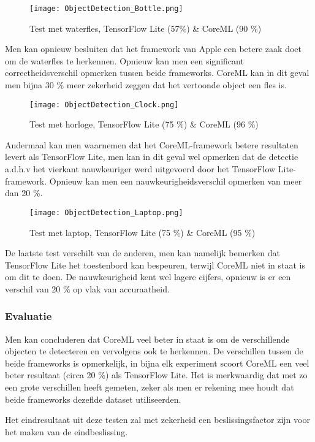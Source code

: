 \begin{figure}[H]
	\centering
	\texttt{[image: ObjectDetection\_Bottle.png]}
	\caption{Test met waterfles, TensorFlow Lite (57\%) \& CoreML (90 \%)}
\end{figure}
Men kan opnieuw besluiten dat het framework van Apple een betere zaak doet om de waterfles te herkennen. Opnieuw kan men een significant correctheidsverschil opmerken tussen beide frameworks. CoreML kan in dit geval men bijna 30 \% meer zekerheid zeggen dat het vertoonde object een fles is.
\begin{figure}[H]
	\centering
	\texttt{[image: ObjectDetection\_Clock.png]}
	\caption{Test met horloge, TensorFlow Lite (75 \%) \& CoreML (96 \%)}
\end{figure}
Andermaal kan men waarnemen dat het CoreML-framework betere resultaten levert als TensorFlow Lite, men kan in dit geval wel opmerken dat de detectie a.d.h.v het vierkant nauwkeuriger werd uitgevoerd door het TensorFlow Lite-framework. Opnieuw kan men een nauwkeurigheidsverschil opmerken van meer dan 20 \%.

\begin{figure}[H]
	\centering
	\texttt{[image: ObjectDetection\_Laptop.png]}
	\caption{Test met laptop, TensorFlow Lite (75 \%) \& CoreML (95 \%)}
\end{figure}
De laatste test verschilt van de anderen, men kan namelijk bemerken dat TensorFlow Lite het toestenbord kan bespeuren, terwijl CoreML niet in staat is om dit te doen. De nauwkeurigheid kent wel lagere cijfers, opnieuw is er een verschil van 20 \% op vlak van accuraatheid.
	
\subsubsection{Evaluatie}
Men kan concluderen dat CoreML veel beter in staat is om de verschillende objecten te detecteren en vervolgens ook te herkennen. De verschillen tussen de beide frameworks is opmerkelijk, in bijna elk experiment scoort CoreML een veel beter resultaat (circa 20 \%) als TensorFlow Lite. Het is merkwaardig dat met zo een grote verschillen heeft gemeten, zeker als men er rekening mee houdt dat beide frameworks dezeflde dataset utiliseerden.

Het eindresultaat uit deze testen zal met zekerheid een beslissingsfactor zijn voor het maken van de eindbeslissing.

\newpage
